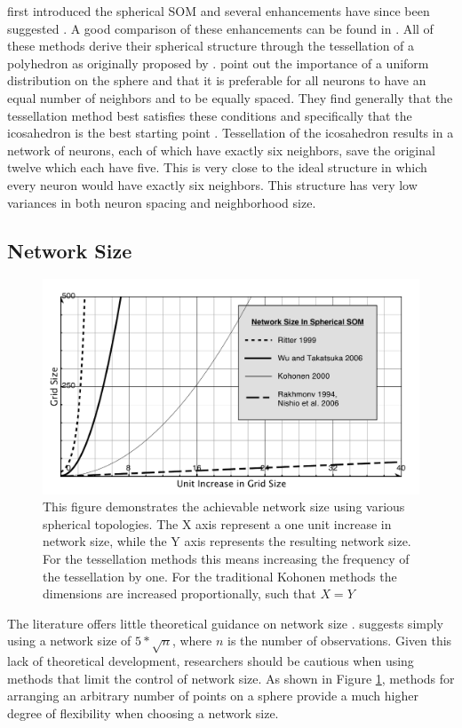 \documentclass[10pt,titlepage]{article}
\begin{document}
\cite{ritter99} first introduced the spherical SOM and several enhancements have
since been suggested \citep{boudjemai2003,sangole03,Nishio:2006fk,wu2006}.  A
good comparison of these enhancements can be found in \cite{wu2006}.  All of
these methods derive their spherical structure through the tessellation of a
polyhedron as originally proposed by \cite{ritter99}.  \cite{wu2006} point
out the importance of a uniform distribution on the sphere and that it is
preferable for all neurons to have an equal number of neighbors and to be
equally spaced.  They find generally that the tessellation method best satisfies
these conditions and specifically that the icosahedron is the best starting
point \citep{wu2005}. Tessellation of the icosahedron results in a network of
neurons, each of which have exactly six neighbors, save the original twelve
which each have five.  This is very close to the ideal structure in which every
neuron would have exactly six neighbors.  This structure has very low variances
in both neuron spacing and neighborhood size.


\subsection{Network Size}
\begin{figure}
\centering
\includegraphics[width=\linewidth]{networkSize.pdf}
\caption{This figure demonstrates the achievable network size using various
spherical topologies. The X axis represent a one unit increase in network size,
while the Y axis represents the resulting network size.
For the tessellation methods this means increasing the frequency of the tessellation
by one.  For the traditional Kohonen methods the dimensions are increased proportionally, such that $X=Y$}
\label{fig:nSize}
\end{figure}
The literature offers little theoretical guidance on network size
\citep{cho1996}.  \cite{toolbox} suggests simply using a network size of
\(5*\sqrt {n}\), where \(n\) is the number of observations. Given this lack of
theoretical development, researchers should be cautious when using methods that
limit the control of network size.  As shown in Figure \ref{fig:nSize},
methods for arranging an arbitrary number of points on a sphere provide a much
higher degree of flexibility when choosing a network size.
\end{document}
